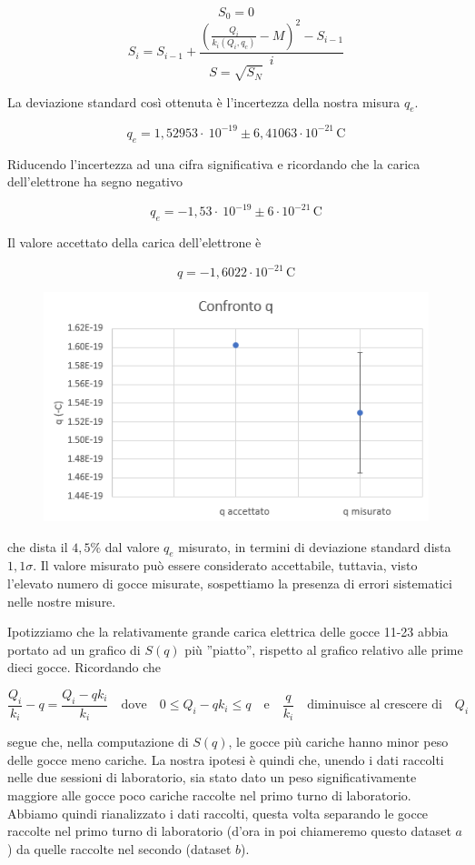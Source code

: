 \documentclass{article}
\begin{document}
\[S_0 = 0\]
\[S_i = S_{i-1} + \frac{(\frac{Q_i}{k_i(Q_i,q_c)} - M)^2 - S_{i-1}}{i}\]
\[S=\sqrt{S_N}\]

La deviazione standard così ottenuta è l'incertezza della nostra misura $q_e$.

\[q_e = 1,52953 \cdot\ 10^{-19} \pm 6,41063 \cdot 10^{-21} \, \textrm{C}\]

Riducendo l'incertezza ad una cifra significativa e ricordando che la carica dell'elettrone ha segno negativo

\[q_e = - 1,53 \cdot\ 10^{-19} \pm 6 \cdot 10^{-21} \, \textrm{C}\]

Il valore accettato della carica dell'elettrone è 

\[q= - 1,6022 \cdot 10^{-21} \, \textrm{C}\]

\begin{figure}[h]
\centering
\includegraphics[width=0.7\linewidth]{Confronto_q}
\end{figure}

che dista il $4,5 \%$ dal valore $q_e$ misurato, in termini di deviazione standard dista $1,1 \sigma$. Il valore misurato può essere considerato accettabile, tuttavia, visto l'elevato numero di gocce misurate, sospettiamo la presenza di errori sistematici nelle nostre misure.

\vspace{5mm}

Ipotizziamo che la relativamente grande carica elettrica delle gocce 11-23 abbia portato ad un grafico di $S(q)$ più ''piatto'', rispetto al grafico relativo alle prime dieci gocce. Ricordando che 

\[\frac{Q_i}{k_i} - q = \frac{Q_i - qk_i}{k_i} \quad \textrm{dove} \quad 0 \leq Q_i - qk_i \leq q \quad \textrm{e} \quad \frac{q}{k_i} \quad \textrm{diminuisce al crescere di} \quad Q_i\]

segue che, nella computazione di $S(q)$, le gocce più cariche hanno minor peso delle gocce meno cariche. La nostra ipotesi è quindi che, unendo i dati raccolti nelle due sessioni di laboratorio, sia stato dato un peso significativamente maggiore alle gocce poco cariche raccolte nel primo turno di laboratorio. Abbiamo quindi rianalizzato i dati raccolti, questa volta separando le gocce raccolte nel primo turno di laboratorio (d'ora in poi chiameremo questo dataset $a$) da quelle raccolte nel secondo (dataset $b$).
\end{document}
